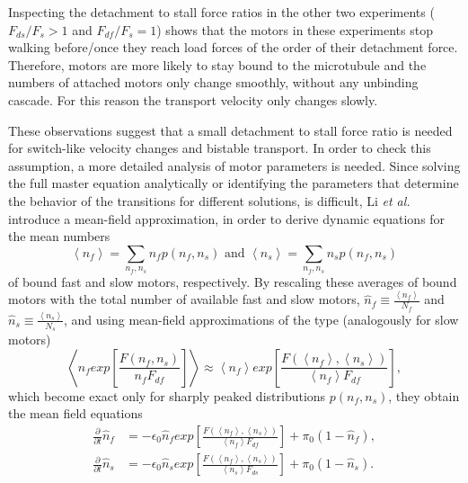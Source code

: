 Inspecting the detachment to stall force ratios in the other two experiments (\mbox{$F_{ds}/F_s > 1$} and \mbox{$F_{df}/F_s = 1$}) shows that the motors in these experiments stop walking
before/once they reach load forces of the order of their detachment force. Therefore, motors are more likely to stay bound to the microtubule and the numbers of attached motors only change smoothly,
without any unbinding cascade. For this reason the transport velocity only changes slowly.

These observations suggest that a small detachment to stall force ratio is needed for switch-like velocity changes and bistable transport. In order to check this assumption, a more detailed 
analysis of motor parameters is needed. Since solving the full master equation analytically or identifying the parameters that determine the behavior of the transitions for different solutions,
is difficult, Li \textit{et al.} \cite{li} introduce a mean-field approximation, in order to derive dynamic equations for the mean numbers
\begin{equation}\label{e.mean-numbers-of-motors}
 \left\langle n_f \right\rangle = \sum_{n_f, n_s} n_f p\left(n_f, n_s\right) \text{ and } \left\langle n_s \right\rangle = \sum_{n_f, n_s} n_s p\left(n_f, n_s\right)
\end{equation}
of bound fast and slow motors, respectively. By rescaling these averages of bound motors with the total number of available fast and slow motors,
\mbox{$\hat n_f \equiv \frac{\left\langle n_f \right\rangle}{N_f}$} and \mbox{$\hat n_s \equiv \frac{\left\langle n_s \right\rangle}{N_s}$}, and using mean-field approximations of the type
(analogously for slow motors)
\begin{equation}\label{e.mean-field-approximation}
 \left\langle n_f exp\left[\frac{F\left(n_f, n_s\right)}{n_f F_{df}}\right]\right\rangle \approx \left\langle n_f \right\rangle exp\left[\frac{F\left(\left\langle n_f \right\rangle, \left\langle n_s \right\rangle\right)}{\left\langle n_f \right\rangle F_{df}}\right],
\end{equation}
which become exact only for sharply peaked distributions $p\left(n_f, n_s\right)$, they obtain the mean field equations
\begin{equation}\label{e.mean-field-equations-for-motor-numbers}
\begin{aligned}
 \frac{\partial}{\partial t} \hat n_f &= -\epsilon_0 \hat n_f exp\left[\frac{F\left(\left\langle n_f \right\rangle, \left\langle n_s \right\rangle\right)}{\left\langle n_f \right\rangle F_{df}}\right] + \pi_0\left(1 - \hat n_f\right), \\
  \frac{\partial}{\partial t} \hat n_s &= -\epsilon_0 \hat n_s exp\left[\frac{F\left(\left\langle n_f \right\rangle, \left\langle n_s \right\rangle\right)}{\left\langle n_s \right\rangle F_{ds}}\right] + \pi_0\left(1 - \hat n_s\right).
\end{aligned}
\end{equation}

